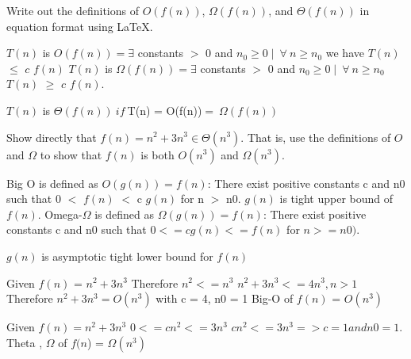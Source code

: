 \documentclass[11pt]{article}
\begin{document}
\begin{questions}
\question[5]
Write out the definitions of $O(f(n))$, $\Omega(f(n))$, and $\Theta(f(n))$ in equation format using \LaTeX. 
\begin{solutionorbox}
	$T(n)$ is $O(f(n)) = \exists$ constants $>$ 0 and $n_0 \geq 0 \mid \: \forall \: n \geq n_0$ we have $T(n)$ $ \leq$ $c$ $f(n)$ 
	\newline
	$T(n)$ is $\Omega(f(n)) = \exists$ constants $>$ 0 and $n_0 \geq 0 \mid \: \forall \: n \geq n_0$  $T(n)$ $\geq$ $c$ $f(n)$.
	\newline
	
	$T(n)$ is $\Theta(f(n)) \: if \: $T(n) = O(f(n))$ = \: \Omega(f(n))$
	\newline
\end{solutionorbox}

\ifprintanswers
\newpage
\else
\bigskip
\fi


\question[10]
Show directly that $f(n) = n^2 + 3n^3 \in \Theta(n^3)$.  That is, use the definitions of $O$ and $\Omega$ to show that $f(n)$ is both $O(n^3)$ and $\Omega(n^3)$.
\begin{solutionorbox}
	\newline
	Big O is defined as $O(g(n)) = f(n)$: There exist positive constants c and n0 such that  0 $<$ $f(n)$ $<$ c $g(n)$ for n $>$ n0.  $g(n)$ is tight upper bound of $f(n)$.
	\newline
	Omega-$\Omega$ is defined as $\Omega$$(g(n)) = f(n)$: There exist positive constants c and n0 such that $0 <= cg(n) <= f(n)$ for $n >= n0)$.
	
	$g(n)$ is asymptotic tight lower bound for $f(n)$
	\newline
	
	   Given $f(n)$ = $n^2 + 3n^3$ \newline
	Therefore $n^2 <= n^3$ \newline
	$n^2 + 3n^3 <= 4n^3, n > 1$ \newline
	Therefore $n^2 + 3n^3 = O(n^3)$ with c = 4, n0 = 1 \newline
	Big-O   of    $f(n)$ = $O(n^3)$ \newline
	
	Given $f(n) = n^2 + 3n^3$ \newline
	$0 <= cn^2 <= 3n^3$ \newline
	$cn^2 <= 3n^3 => c = 1 and n0 = 1.$ \newline
	Theta , $\Omega$ of $f(n$) = $\Omega$$(n^3)$\newline
\end{solutionorbox}


\end{questions}
\end{document}
